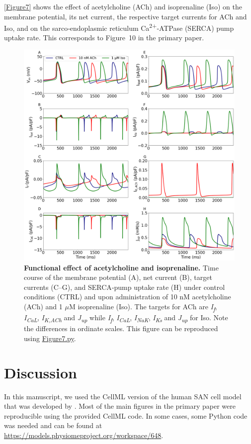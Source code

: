 \documentclass[fleqn,10pt]{physiome}
\begin{document}
\autoref{Figure7} shows the effect of acetylcholine (ACh) and isoprenaline (Iso) on the membrane potential, its net current, the respective target currents for ACh and Iso, and on the sarco‐endoplasmic reticulum Ca\textsuperscript{2+}‐ATPase (SERCA) pump uptake rate. This corresponds to Figure~10 in the primary paper.
\begin{figure}[htbp]
\centering
\includegraphics[width=0.95\linewidth]{Figure7}
\caption{\textbf{Functional effect of acetylcholine and isoprenaline.}\newline
Time course of the membrane potential (A), net current (B), target currents (C–G), and SERCA‐pump uptake rate (H) under control conditions (CTRL) and upon administration of 10 nM acetylcholine (ACh) and 1 $\mu$M isoprenaline (Iso). The targets for ACh are \textit{I\textsubscript{f}}, \textit{I\textsubscript{CaL}}, \textit{I\textsubscript{K,ACh}} and \textit{J\textsubscript{up}} while \textit{I\textsubscript{f}}, \textit{I\textsubscript{CaL}}, \textit{I\textsubscript{NaK}}, \textit{I\textsubscript{Ks}} and \textit{J\textsubscript{up}} for Iso. Note the differences in ordinate scales. This figure can be reproduced using \href{https://models.physiomeproject.org/workspace/648/rawfile/6784d6c3256c832dc98b2db42c85747ae2596518/Figure7.py}{Figure7.py}.}
\label{Figure7}
\end{figure}

\section{Discussion}

In this manuscript, we used the CellML version of the human SAN cell model that was developed by \citet{fabbri2017computational}. Most of the main figures in the primary paper were reproducible using the provided CellML code. In some cases, some Python code was needed and can be found at \url{https://models.physiomeproject.org/workspace/648}.\newline


\end{document}
